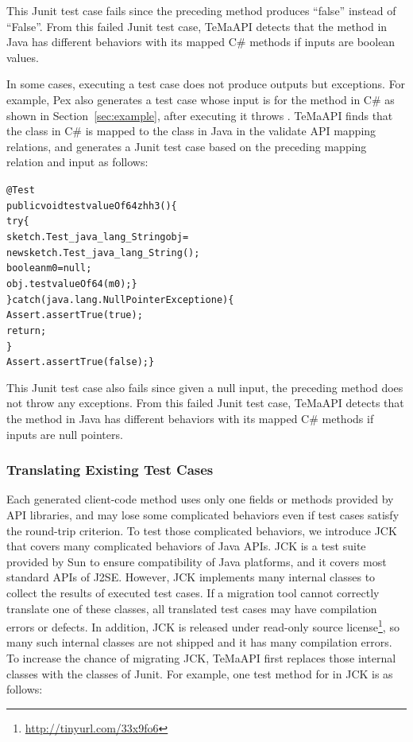 This Junit test case fails since the preceding  method produces ``false'' instead of ``False''. From this failed Junit test case, TeMaAPI detects that the  method in Java has different behaviors with its mapped C\# methods if inputs are boolean values.

In some cases, executing a test case does not produce outputs but exceptions. For example, Pex also generates a test case whose input is  for the  method in C\# as shown in Section~\ref{sec:example}, after executing it throws . TeMaAPI finds that the  class in C\# is mapped to the  class in Java in the validate API mapping relations, and generates a Junit test case based on the preceding mapping relation and input as follows:

\begin{CodeOut}%
\begin{alltt}
 @Test
 public void testvalueOf64zhh3()\{
   try\{
     sketch.Test_java_lang_String obj =
                       new sketch.Test_java_lang_String();
     boolean m0 = null;
     obj.testvalueOf64(m0);\}
   \}catch(java.lang.NullPointerException e)\{
       Assert.assertTrue(true);
       return;
   \}
   Assert.assertTrue(false);\}
\end{alltt}
\end{CodeOut}

This Junit test case also fails since given a null input, the preceding  method does not throw any exceptions. From this failed Junit test case, TeMaAPI detects that the  method in Java has different behaviors with its mapped C\# methods if inputs are null pointers.

\subsubsection{Translating Existing Test Cases}
\label{sec:approach:behavior:jck}

Each generated client-code method uses only one fields or methods provided by API libraries, and may lose some complicated behaviors even if test cases satisfy the round-trip criterion. To test those complicated behaviors, we introduce JCK that covers many complicated behaviors of Java APIs. JCK is a test suite provided by Sun to ensure compatibility of Java platforms, and it covers most standard APIs of J2SE. However, JCK implements many internal classes to collect the results of executed test cases. If a migration tool cannot correctly translate one of these classes, all translated test cases may have compilation errors or defects. In addition, JCK is released under read-only source license\footnote{\url{http://tinyurl.com/33x9fo6}}, so many such internal classes are not shipped and it has many compilation errors. To increase the chance of migrating JCK, TeMaAPI first replaces those internal classes with the classes of Junit. For example, one test method for  in JCK is as follows:

